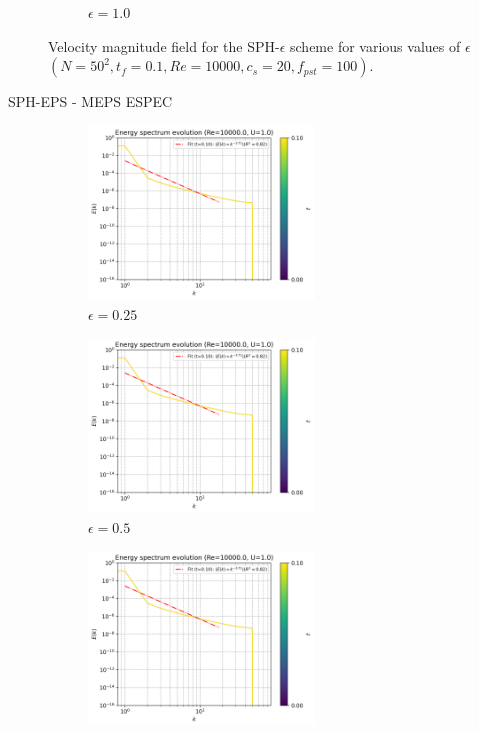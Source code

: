 \begin{figure}[H]
\begin{subfigure}{7cm}
  \caption{$\epsilon = 1.0$}
  \end{subfigure}
  \caption{Velocity magnitude field for the SPH-$\epsilon$ scheme for various values of $\epsilon$ $(N=50^2, t_f=0.1, Re=10000, c_s=20, f_{pst}=100)$.}
  \label{fig:sph-eps-meps-vmag}
\end{figure}

SPH-EPS - MEPS ESPEC 
\begin{figure}[H]
  \begin{subfigure}{7cm}
  \centering\includegraphics[width=6cm]{Code-Figures/mon2017/meps/c0_20_tait_pec_dtmul_1_meps_0.25_nx_100_pst_10_re_10000_mon2017/energy_spectrum_evolution.png}
  \caption{$\epsilon = 0.25$}
  \end{subfigure}
  \begin{subfigure}{7cm}
  \centering\includegraphics[width=6cm]{Code-Figures/mon2017/meps/c0_20_tait_pec_dtmul_1_meps_0.5_nx_100_pst_10_re_10000_mon2017/energy_spectrum_evolution.png}
  \caption{$\epsilon = 0.5$}
  \end{subfigure}
  \begin{subfigure}{7cm}
  \centering\includegraphics[width=6cm]{Code-Figures/mon2017/meps/c0_20_tait_pec_dtmul_1_meps_0.75_nx_100_pst_10_re_10000_mon2017/energy_spectrum_evolution.png}

\end{subfigure}
\end{figure}
